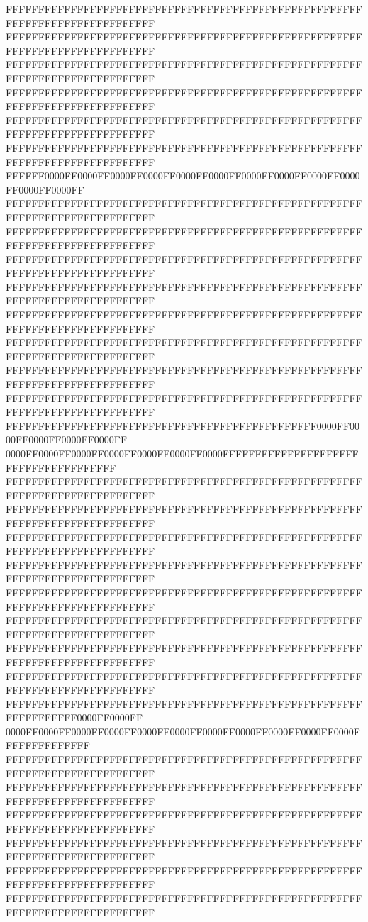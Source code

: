 FFFFFFFFFFFFFFFFFFFFFFFFFFFFFFFFFFFFFFFFFFFFFFFFFFFFFFFFFFFFFFFFFFFFFFFFFFFFFF
FFFFFFFFFFFFFFFFFFFFFFFFFFFFFFFFFFFFFFFFFFFFFFFFFFFFFFFFFFFFFFFFFFFFFFFFFFFFFF
FFFFFFFFFFFFFFFFFFFFFFFFFFFFFFFFFFFFFFFFFFFFFFFFFFFFFFFFFFFFFFFFFFFFFFFFFFFFFF
FFFFFFFFFFFFFFFFFFFFFFFFFFFFFFFFFFFFFFFFFFFFFFFFFFFFFFFFFFFFFFFFFFFFFFFFFFFFFF
FFFFFFFFFFFFFFFFFFFFFFFFFFFFFFFFFFFFFFFFFFFFFFFFFFFFFFFFFFFFFFFFFFFFFFFFFFFFFF
FFFFFFFFFFFFFFFFFFFFFFFFFFFFFFFFFFFFFFFFFFFFFFFFFFFFFFFFFFFFFFFFFFFFFFFFFFFFFF
FFFFFF0000FF0000FF0000FF0000FF0000FF0000FF0000FF0000FF0000FF0000FF0000FF0000FF
FFFFFFFFFFFFFFFFFFFFFFFFFFFFFFFFFFFFFFFFFFFFFFFFFFFFFFFFFFFFFFFFFFFFFFFFFFFFFF
FFFFFFFFFFFFFFFFFFFFFFFFFFFFFFFFFFFFFFFFFFFFFFFFFFFFFFFFFFFFFFFFFFFFFFFFFFFFFF
FFFFFFFFFFFFFFFFFFFFFFFFFFFFFFFFFFFFFFFFFFFFFFFFFFFFFFFFFFFFFFFFFFFFFFFFFFFFFF
FFFFFFFFFFFFFFFFFFFFFFFFFFFFFFFFFFFFFFFFFFFFFFFFFFFFFFFFFFFFFFFFFFFFFFFFFFFFFF
FFFFFFFFFFFFFFFFFFFFFFFFFFFFFFFFFFFFFFFFFFFFFFFFFFFFFFFFFFFFFFFFFFFFFFFFFFFFFF
FFFFFFFFFFFFFFFFFFFFFFFFFFFFFFFFFFFFFFFFFFFFFFFFFFFFFFFFFFFFFFFFFFFFFFFFFFFFFF
FFFFFFFFFFFFFFFFFFFFFFFFFFFFFFFFFFFFFFFFFFFFFFFFFFFFFFFFFFFFFFFFFFFFFFFFFFFFFF
FFFFFFFFFFFFFFFFFFFFFFFFFFFFFFFFFFFFFFFFFFFFFFFFFFFFFFFFFFFFFFFFFFFFFFFFFFFFFF
FFFFFFFFFFFFFFFFFFFFFFFFFFFFFFFFFFFFFFFFFFFFFFFF0000FF0000FF0000FF0000FF0000FF
0000FF0000FF0000FF0000FF0000FF0000FF0000FFFFFFFFFFFFFFFFFFFFFFFFFFFFFFFFFFFFFF
FFFFFFFFFFFFFFFFFFFFFFFFFFFFFFFFFFFFFFFFFFFFFFFFFFFFFFFFFFFFFFFFFFFFFFFFFFFFFF
FFFFFFFFFFFFFFFFFFFFFFFFFFFFFFFFFFFFFFFFFFFFFFFFFFFFFFFFFFFFFFFFFFFFFFFFFFFFFF
FFFFFFFFFFFFFFFFFFFFFFFFFFFFFFFFFFFFFFFFFFFFFFFFFFFFFFFFFFFFFFFFFFFFFFFFFFFFFF
FFFFFFFFFFFFFFFFFFFFFFFFFFFFFFFFFFFFFFFFFFFFFFFFFFFFFFFFFFFFFFFFFFFFFFFFFFFFFF
FFFFFFFFFFFFFFFFFFFFFFFFFFFFFFFFFFFFFFFFFFFFFFFFFFFFFFFFFFFFFFFFFFFFFFFFFFFFFF
FFFFFFFFFFFFFFFFFFFFFFFFFFFFFFFFFFFFFFFFFFFFFFFFFFFFFFFFFFFFFFFFFFFFFFFFFFFFFF
FFFFFFFFFFFFFFFFFFFFFFFFFFFFFFFFFFFFFFFFFFFFFFFFFFFFFFFFFFFFFFFFFFFFFFFFFFFFFF
FFFFFFFFFFFFFFFFFFFFFFFFFFFFFFFFFFFFFFFFFFFFFFFFFFFFFFFFFFFFFFFFFFFFFFFFFFFFFF
FFFFFFFFFFFFFFFFFFFFFFFFFFFFFFFFFFFFFFFFFFFFFFFFFFFFFFFFFFFFFFFFFF0000FF0000FF
0000FF0000FF0000FF0000FF0000FF0000FF0000FF0000FF0000FF0000FF0000FFFFFFFFFFFFFF
FFFFFFFFFFFFFFFFFFFFFFFFFFFFFFFFFFFFFFFFFFFFFFFFFFFFFFFFFFFFFFFFFFFFFFFFFFFFFF
FFFFFFFFFFFFFFFFFFFFFFFFFFFFFFFFFFFFFFFFFFFFFFFFFFFFFFFFFFFFFFFFFFFFFFFFFFFFFF
FFFFFFFFFFFFFFFFFFFFFFFFFFFFFFFFFFFFFFFFFFFFFFFFFFFFFFFFFFFFFFFFFFFFFFFFFFFFFF
FFFFFFFFFFFFFFFFFFFFFFFFFFFFFFFFFFFFFFFFFFFFFFFFFFFFFFFFFFFFFFFFFFFFFFFFFFFFFF
FFFFFFFFFFFFFFFFFFFFFFFFFFFFFFFFFFFFFFFFFFFFFFFFFFFFFFFFFFFFFFFFFFFFFFFFFFFFFF
FFFFFFFFFFFFFFFFFFFFFFFFFFFFFFFFFFFFFFFFFFFFFFFFFFFFFFFFFFFFFFFFFFFFFFFFFFFFFF
